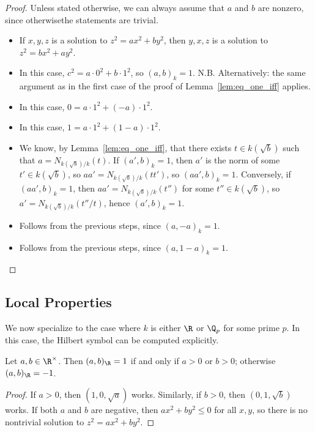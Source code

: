 \begin{proof}
	Unless stated otherwise, we can always assume that $a$ and $b$ are nonzero, since otherwisethe statements are trivial.
	\begin{itemize}
		\item If $x,y,z$ is a solution to $z^2 = ax^2 + by^2$, then $y,x,z$ is a solution to
	$z^2 = bx^2 + ay^2$.
		\item In this case, $c^2 = a \cdot 0^2 + b \cdot 1^2$, so $(a,b)_k=1$.
		N.B. Alternatively: the same argument as in the first case of the proof of Lemma~\ref{lem:eq_one_iff} applies.
		\item In this case, $0 = a \cdot 1^2 + (-a) \cdot 1^2$.
		\item In this case, $1 = a \cdot 1^2 + (1 - a) \cdot 1^2$.
		\item We know, by Lemma~\ref{lem:eq_one_iff}, that there exists $t \in k(\sqrt{b})$ such that
		$a = N_{k(\sqrt{b})/k}(t)$. If $(a',b)_k=1$, then $a'$ is the norm of some $t' \in k(\sqrt{b})$,
		so $aa' = N_{k(\sqrt{b})/k}(t t')$, so $(aa', b)_k = 1$. Conversely, if $(aa', b)_k = 1$, then
		$aa' = N_{k(\sqrt{b})/k}(t'')$ for some $t'' \in k(\sqrt{b})$, so
		$a' = N_{k(\sqrt{b})/k}(t''/t)$, hence $(a', b)_k = 1$.
		\item Follows from the previous steps, since $(a, -a)_k = 1$.
		\item Follows from the previous steps, since $(a, 1 - a)_k = 1$.
	\end{itemize}
\end{proof}
\subsection{Local Properties}
We now specialize to the case where $k$ is either $\R$ or $\Q_p$ for some prime $p$. In this case, the Hilbert symbol can be computed explicitly.

\begin{theorem}
	\label{thm:real}
	\leanok
	Let $a, b \in \R^\times$. Then $(a, b)_{\R} = 1$ if and only if $a > 0$ or $b > 0$; otherwise $(a, b)_{\R} = -1$.
\end{theorem}

\begin{proof}
	If $a>0$, then $(1,0,\sqrt{a})$ works. Similarly, if $b>0$, then $(0,1,\sqrt{b})$ works.
	If both $a$ and $b$ are negative, then $ax^2 + by^2 \le 0$ for all $x,y$, so there is no
	nontrivial solution to $z^2 = ax^2 + by^2$.
\end{proof}

